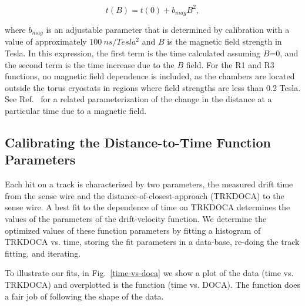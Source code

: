 \begin{equation} 
\label{eq-bmax}
t(B) = t(0) + b_{mag} B^2,
\end{equation}

\noindent
where $b_{mag}$ is an adjustable parameter that is determined by calibration with a
value of approximately $100~ns/Tesla^2$ and $B$ is the magnetic field strength in Tesla. In this expression, the
first term is the time calculated assuming $B$=0, and the second term is the time increase due to the $B$
field. For the R1 and R3 functions, no magnetic field dependence is included, as the chambers are located
outside the torus cryostats in regions where field strengths are less than 0.2 Tesla.  
See Ref.~\cite{qin96} for a related
parameterization of the change in the distance at a particular time due to a magnetic field. 

\subsection{Calibrating the Distance-to-Time Function Parameters}

Each hit on a track is characterized by two parameters, the measured drift 
time from the sense wire and the distance-of-closest-approach (TRKDOCA) to the 
sense wire.  A best fit to the dependence of time on TRKDOCA determines the
values of the parameters of the drift-velocity function. 
We determine the optimized values of these function parameters by fitting
a histogram of TRKDOCA vs. time, storing the fit parameters in a data-base, re-doing
the track fitting, and iterating.

To illustrate our fits, in Fig.~\ref{time-vs-doca} we show a plot of
the data (time vs. TRKDOCA) and overplotted is the function (time vs. DOCA).
The function does a fair job of following the shape of the data.

